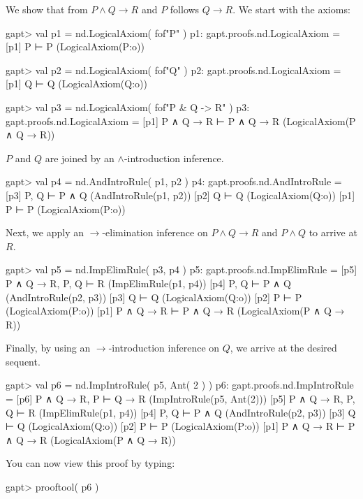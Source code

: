 \documentclass[a4paper,11pt]{book}
\newcommand{\impl}{\to} %
\renewcommand{\land}{\wedge}
\begin{document}
We show that from $P \land Q \impl R$ and $P$ follows $Q \impl R$. We start with
the axioms:

\begin{clilisting}
gapt> val p1 = nd.LogicalAxiom( fof"P" )
p1: gapt.proofs.nd.LogicalAxiom =
[p1] P ⊢ P    (LogicalAxiom(P:o))

gapt> val p2 = nd.LogicalAxiom( fof"Q" )
p2: gapt.proofs.nd.LogicalAxiom =
[p1] Q ⊢ Q    (LogicalAxiom(Q:o))

gapt> val p3 = nd.LogicalAxiom( fof"P & Q -> R" )
p3: gapt.proofs.nd.LogicalAxiom =
[p1] P ∧ Q → R ⊢ P ∧ Q → R    (LogicalAxiom(P ∧ Q → R))

\end{clilisting}

$P$ and $Q$ are joined by an $\land$-introduction inference.

\begin{clilisting}
gapt> val p4 = nd.AndIntroRule( p1, p2 )
p4: gapt.proofs.nd.AndIntroRule =
[p3] P, Q ⊢ P ∧ Q    (AndIntroRule(p1, p2))
[p2] Q ⊢ Q    (LogicalAxiom(Q:o))
[p1] P ⊢ P    (LogicalAxiom(P:o))

\end{clilisting}

Next, we apply an $\impl$-elimination inference on $P \land Q \impl R$
and $P \land Q$ to arrive at $R$.

\begin{clilisting}
gapt> val p5 = nd.ImpElimRule( p3, p4 )
p5: gapt.proofs.nd.ImpElimRule =
[p5] P ∧ Q → R, P, Q ⊢ R    (ImpElimRule(p1, p4))
[p4] P, Q ⊢ P ∧ Q    (AndIntroRule(p2, p3))
[p3] Q ⊢ Q    (LogicalAxiom(Q:o))
[p2] P ⊢ P    (LogicalAxiom(P:o))
[p1] P ∧ Q → R ⊢ P ∧ Q → R    (LogicalAxiom(P ∧ Q → R))

\end{clilisting}

Finally, by using an $\impl$-introduction inference on $Q$, we arrive
at the desired sequent.

\begin{clilisting}
gapt> val p6 = nd.ImpIntroRule( p5, Ant( 2 ) )
p6: gapt.proofs.nd.ImpIntroRule =
[p6] P ∧ Q → R, P ⊢ Q → R    (ImpIntroRule(p5, Ant(2)))
[p5] P ∧ Q → R, P, Q ⊢ R    (ImpElimRule(p1, p4))
[p4] P, Q ⊢ P ∧ Q    (AndIntroRule(p2, p3))
[p3] Q ⊢ Q    (LogicalAxiom(Q:o))
[p2] P ⊢ P    (LogicalAxiom(P:o))
[p1] P ∧ Q → R ⊢ P ∧ Q → R    (LogicalAxiom(P ∧ Q → R))

\end{clilisting}

You can now view this proof by typing:
\begin{clilisting}
gapt> prooftool( p6 )

\end{clilisting}
\end{document}
